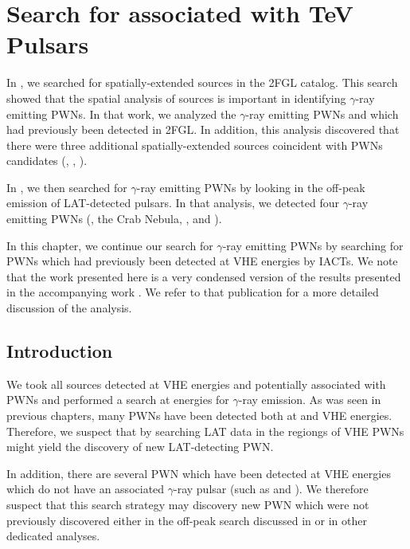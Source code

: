 \chapter{Search for  associated with TeV Pulsars}


In , we searched for spatially-extended sources
in the 2FGL catalog.  This search showed that the spatial analysis of
\fermi sources is important in identifying $\gamma$-ray emitting \acp{PWN}.
In that work, we analyzed the $\gamma$-ray emitting \acp{PWN} 
and \mshfifteenfiftytwo which had previously been detected in \ac{2FGL}.
In addition, this analysis discovered that there were three additional
spatially-extended \fermi sources coincident with \acp{PWN} candidates
(, , ).

In , we then searched for $\gamma$-ray emitting \acp{PWN}
by looking in the off-peak emission of \ac{LAT}-detected
pulsars. In that analysis, we detected four $\gamma$-ray emitting \acp{PWN}
(\velax, the Crab Nebula, \mshfifteenfiftytwo, and \threecfiftyeight).

In this chapter, we continue our search for $\gamma$-ray emitting
\acp{PWN} by searching for \acp{PWN} which had previously been detected
at \ac{VHE} energies by \acp{IACT}. We note that the work presented here is a
very condensed version of the results presented in the accompanying work
\citep{acero_2013a_constraints-galactic}.  We refer to that publication
for a more detailed discussion of the analysis.

\section{Introduction}

We took all sources detected at \ac{VHE} energies and potentially associated
with \acp{PWN} and performed a search at \gev energies for $\gamma$-ray
emission. As was seen in previous chapters, many \acp{PWN} have been
detected both at \gev and \ac{VHE} energies. Therefore, we suspect that by
searching \ac{LAT} data in the regiongs of \ac{VHE} \acp{PWN} might yield
the discovery of new LAT-detecting \ac{PWN}.

In addition, there are several \ac{PWN} which have been detected at \ac{VHE}
energies which do not have an associated $\gamma$-ray pulsar (such as
 and ).  We therefore suspect that this search
strategy may discovery new \ac{PWN} which were not previously discovered
either in the off-peak search discussed in  or in other
dedicated analyses.

